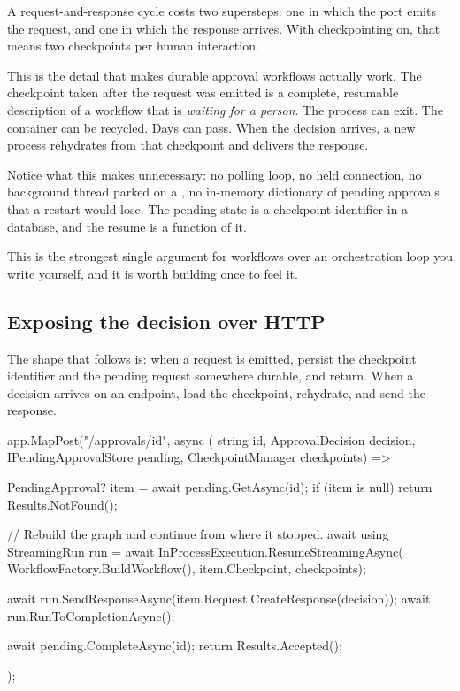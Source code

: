 A request-and-response cycle costs two supersteps: one in which the port emits
the request, and one in which the response arrives. With checkpointing on, that
means two checkpoints per human interaction.

This is the detail that makes durable approval workflows actually work. The
checkpoint taken after the request was emitted is a complete, resumable
description of a workflow that is \emph{waiting for a person}. The process can
exit. The container can be recycled. Days can pass. When the decision arrives,
a new process rehydrates from that checkpoint and delivers the response.

\begin{note}
Notice what this makes unnecessary: no polling loop, no held connection, no
background thread parked on a , no in-memory
dictionary of pending approvals that a restart would lose. The pending state is
a checkpoint identifier in a database, and the resume is a function of it.

This is the strongest single argument for workflows over an orchestration loop
you write yourself, and it is worth building once to feel it.
\end{note}

\subsection{Exposing the decision over HTTP}

The shape that follows is: when a request is emitted, persist the checkpoint
identifier and the pending request somewhere durable, and return. When a decision
arrives on an endpoint, load the checkpoint, rehydrate, and send the response.

\begin{csharp}[caption={The approval endpoint}, label={lst:dur-endpoint}]
app.MapPost("/approvals/{id}", async (
    string id,
    ApprovalDecision decision,
    IPendingApprovalStore pending,
    CheckpointManager checkpoints) =>
{
    PendingApproval? item = await pending.GetAsync(id);
    if (item is null)
    {
        return Results.NotFound();
    }

    // Rebuild the graph and continue from where it stopped.
    await using StreamingRun run = await InProcessExecution.ResumeStreamingAsync(
        WorkflowFactory.BuildWorkflow(), item.Checkpoint, checkpoints);

    await run.SendResponseAsync(item.Request.CreateResponse(decision));
    await run.RunToCompletionAsync();

    await pending.CompleteAsync(id);
    return Results.Accepted();
});
\end{csharp}

